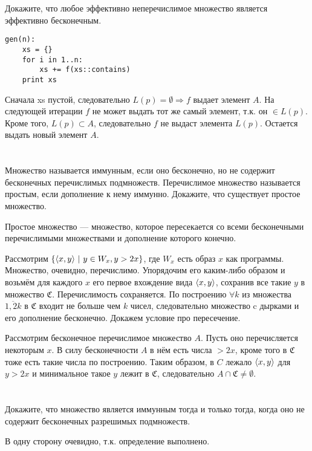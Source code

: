 \section{}
Докажите, что любое эффективно неперечислимое множество является эффективно бесконечным.

\begin{verbatim}
gen(n):
    xs = {}
    for i in 1..n:
        xs += f(xs::contains)
    print xs
\end{verbatim}

Сначала xs пустой, следовательно \(L(p) = \emptyset \Rightarrow f\) выдает элемент \(A\). На следующей итерации \(f\) не может выдать тот же самый элемент, т.к. он \(\in L(p)\). Кроме того, \(L(p) \subset A\), следовательно \(f\) не выдаст элемента \(L(p)\). Остается выдать новый элемент \(A\).

\section{}
Множество называется иммунным, если оно бесконечно, но не содержит бесконечных перечислимых подмножеств. Перечислимое множество называется простым, если дополнение к нему иммунно. Докажите, что существует простое множество.

Простое множество --- множество, которое пересекается со всеми бесконечными перечислимыми множествами и дополнение которого конечно.

Рассмотрим \(\{\langle x, y\rangle\ |\ y \in W_x, y > 2x\}\), где \(W_x\) есть образ \(x\) как программы. Множество, очевидно, перечислимо. Упорядочим его каким-либо образом и возьмём для каждого \(x\) его первое вхождение вида \(\langle x, y\rangle\), сохранив все такие \(y\) в множество \(\mathfrak{C}\). Перечислимость сохраняется. По построению \(\forall k\) из множества \(\overline{1, 2k}\) в \(\mathfrak{C}\) входит не больше чем \(k\) чисел, следовательно множество c дырками и его дополнение бесконечно. Докажем условие про пересечение.

Рассмотрим бесконечное перечислимое множество \(A\). Пусть оно перечисляется некоторым \(x\). В силу бесконечности \(A\) в нём есть числа \( > 2x\), кроме того в \(\mathfrak{C}\) тоже есть такие числа по построению. Таким образом, в \(C\) лежало \(\langle x, y\rangle\) для \(y > 2x\) и минимальное такое \(y\) лежит в \(\mathfrak{C}\), следовательно \(A \cap \mathfrak{C} \neq  \emptyset\).

\section{}
Докажите, что множество является иммунным тогда и только тогда, когда оно не содержит бесконечных разрешимых подмножеств.

В одну сторону очевидно, т.к. определение выполнено.




